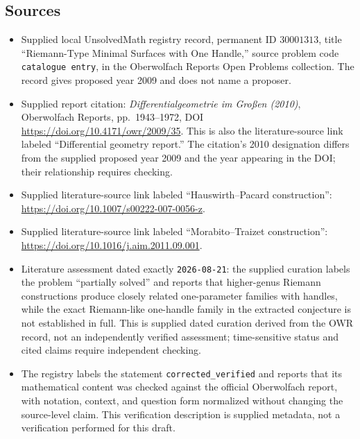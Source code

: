\documentclass[11pt]{article}
\begin{document}
\subsection{Sources}
\begin{itemize}
\item Supplied local UnsolvedMath registry record, permanent ID \(30001313\), title ``Riemann-Type Minimal Surfaces with One Handle,'' source problem code \texttt{catalogue entry}, in the Oberwolfach Reports Open Problems collection. The record gives proposed year 2009 and does not name a proposer.
\item Supplied report citation: \emph{Differentialgeometrie im Großen (2010)}, Oberwolfach Reports, pp.\ 1943--1972, DOI \url{https://doi.org/10.4171/owr/2009/35}. This is also the literature-source link labeled ``Differential geometry report.'' The citation's 2010 designation differs from the supplied proposed year 2009 and the year appearing in the DOI; their relationship requires checking.
\item Supplied literature-source link labeled ``Hauswirth--Pacard construction'': \url{https://doi.org/10.1007/s00222-007-0056-z}.
\item Supplied literature-source link labeled ``Morabito--Traizet construction'': \url{https://doi.org/10.1016/j.aim.2011.09.001}.
\item Literature assessment dated exactly \texttt{2026-08-21}: the supplied curation labels the problem ``partially solved'' and reports that higher-genus Riemann constructions produce closely related one-parameter families with handles, while the exact Riemann-like one-handle family in the extracted conjecture is not established in full. This is supplied dated curation derived from the OWR record, not an independently verified assessment; time-sensitive status and cited claims require independent checking.
\item The registry labels the statement \texttt{corrected\_verified} and reports that its mathematical content was checked against the official Oberwolfach report, with notation, context, and question form normalized without changing the source-level claim. This verification description is supplied metadata, not a verification performed for this draft.
\end{itemize}
\end{document}
